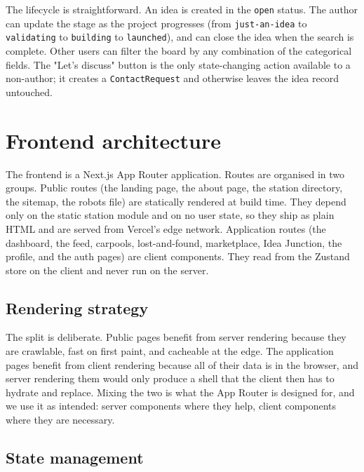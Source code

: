\documentclass[a4paper,11pt]{article}
\begin{document}
\noindent
The lifecycle is straightforward. An idea is created in the \texttt{open}
status. The author can update the stage as the project progresses (from
\texttt{just-an-idea} to \texttt{validating} to \texttt{building} to
\texttt{launched}), and can close the idea when the search is complete. Other
users can filter the board by any combination of the categorical fields. The
"Let's discuss" button is the only state-changing action available to a
non-author; it creates a \texttt{ContactRequest} and otherwise leaves the idea
record untouched.


\section{Frontend architecture}

The frontend is a Next.js App Router application. Routes are organised in two
groups. Public routes (the landing page, the about page, the station
directory, the sitemap, the robots file) are statically rendered at build
time. They depend only on the static station module and on no user state, so
they ship as plain HTML and are served from Vercel's edge network.
Application routes (the dashboard, the feed, carpools, lost-and-found,
marketplace, Idea Junction, the profile, and the auth pages) are client
components. They read from the Zustand store on the client and never run on
the server.

\subsection{Rendering strategy}

The split is deliberate. Public pages benefit from server rendering because
they are crawlable, fast on first paint, and cacheable at the edge. The
application pages benefit from client rendering because all of their data is
in the browser, and server rendering them would only produce a shell that the
client then has to hydrate and replace. Mixing the two is what the App Router
is designed for, and we use it as intended: server components where they help,
client components where they are necessary.

\subsection{State management}
\end{document}
